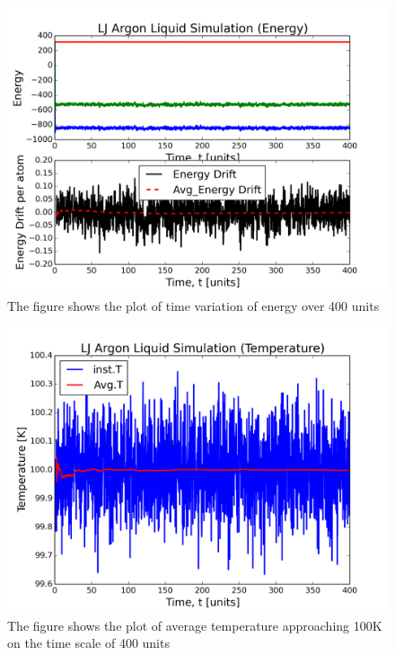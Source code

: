 \documentclass{article}
\begin{document}
\begin{figure}[htb]
\centering
\includegraphics[width=.9\linewidth]{./heat-capacity/LJ-md-Ener.png}
\caption{\label{fig:P3a}The figure shows the plot of time variation of energy over 400 units}
\end{figure}

\begin{figure}[htb]
\centering
\includegraphics[width=.9\linewidth]{./heat-capacity/LJ-md-Temp.png}
\caption{\label{fig:P3b}The figure shows the plot of average temperature approaching 100K on the time scale of 400 units}
\end{figure}
\end{document}
